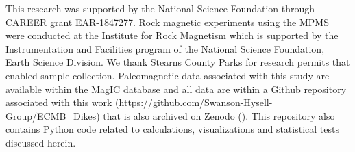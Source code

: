 \documentclass[draft]{agujournal2019}
\begin{document}
%
%
%
%
%
%
%
%


\acknowledgments
This research was supported by the National Science Foundation through CAREER grant EAR-1847277. Rock magnetic experiments using the MPMS were conducted at the Institute for Rock Magnetism which is supported by the Instrumentation and Facilities program of the National Science Foundation, Earth Science Division. We thank Stearns County Parks for research permits that enabled sample collection. Paleomagnetic data associated with this study are available within the MagIC database and all data are within a Github repository associated with this work (\url{https://github.com/Swanson-Hysell-Group/ECMB_Dikes}) that is also archived on Zenodo (). This repository also contains Python code related to calculations, visualizations and statistical tests discussed herein.  



%

%





\end{document}
